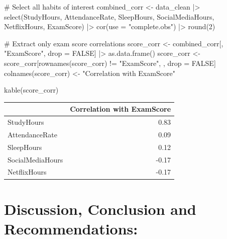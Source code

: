 \documentclass[
  11pt,
  letterpaper,
  DIV=11,
  numbers=noendperiod]{scrartcl}
\newenvironment{Shaded}{\begin{snugshade}}{\end{snugshade}}
\newcommand{\AttributeTok}[1]{\textcolor[rgb]{0.40,0.45,0.13}{#1}}
\newcommand{\CommentTok}[1]{\textcolor[rgb]{0.37,0.37,0.37}{#1}}
\newcommand{\ConstantTok}[1]{\textcolor[rgb]{0.56,0.35,0.01}{#1}}
\newcommand{\DecValTok}[1]{\textcolor[rgb]{0.68,0.00,0.00}{#1}}
\newcommand{\FunctionTok}[1]{\textcolor[rgb]{0.28,0.35,0.67}{#1}}
\newcommand{\NormalTok}[1]{\textcolor[rgb]{0.00,0.23,0.31}{#1}}
\newcommand{\OtherTok}[1]{\textcolor[rgb]{0.00,0.23,0.31}{#1}}
\newcommand{\SpecialCharTok}[1]{\textcolor[rgb]{0.37,0.37,0.37}{#1}}
\newcommand{\StringTok}[1]{\textcolor[rgb]{0.13,0.47,0.30}{#1}}
\begin{document}
\begin{Shaded}
\begin{Highlighting}[]
\CommentTok{\# Select all habits of interest}
\NormalTok{combined\_corr }\OtherTok{\textless{}{-}}\NormalTok{ data\_clean }\SpecialCharTok{|\textgreater{}}
  \FunctionTok{select}\NormalTok{(StudyHours, AttendanceRate, SleepHours, SocialMediaHours, NetflixHours, ExamScore) }\SpecialCharTok{|\textgreater{}}
  \FunctionTok{cor}\NormalTok{(}\AttributeTok{use =} \StringTok{"complete.obs"}\NormalTok{) }\SpecialCharTok{|\textgreater{}}
  \FunctionTok{round}\NormalTok{(}\DecValTok{2}\NormalTok{)}

\CommentTok{\# Extract only exam score correlations}
\NormalTok{score\_corr }\OtherTok{\textless{}{-}}\NormalTok{ combined\_corr[, }\StringTok{"ExamScore"}\NormalTok{, drop }\OtherTok{=} \ConstantTok{FALSE}\NormalTok{] }\SpecialCharTok{|\textgreater{}}
  \FunctionTok{as.data.frame}\NormalTok{()}
\NormalTok{score\_corr }\OtherTok{\textless{}{-}}\NormalTok{ score\_corr[}\FunctionTok{rownames}\NormalTok{(score\_corr) }\SpecialCharTok{!=} \StringTok{"ExamScore"}\NormalTok{, , drop }\OtherTok{=} \ConstantTok{FALSE}\NormalTok{]}
\FunctionTok{colnames}\NormalTok{(score\_corr) }\OtherTok{\textless{}{-}} \StringTok{"Correlation with ExamScore"}

\FunctionTok{kable}\NormalTok{(score\_corr)}
\end{Highlighting}
\end{Shaded}

\begin{longtable}[]{@{}lr@{}}
\toprule\noalign{}
& Correlation with ExamScore \\
\midrule\noalign{}
\endhead
\bottomrule\noalign{}
\endlastfoot
StudyHours & 0.83 \\
AttendanceRate & 0.09 \\
SleepHours & 0.12 \\
SocialMediaHours & -0.17 \\
NetflixHours & -0.17 \\
\end{longtable}

\newpage

\section{Discussion, Conclusion and
Recommendations:}\label{discussion-conclusion-and-recommendations}
\end{document}
